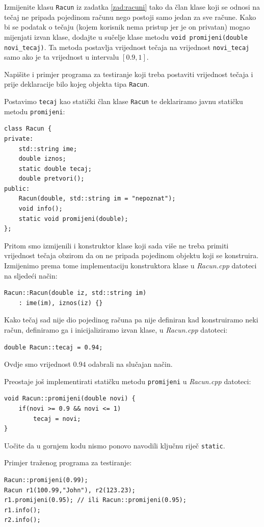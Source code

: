 \begin{zadatak}\label{zad:racuni-static}
    Izmijenite klasu \texttt{Racun} iz zadatka \ref{zad:racuni}
    tako da član klase koji se odnosi na tečaj ne pripada pojedinom
    računu nego postoji samo jedan za sve račune.
    Kako bi se podatak o tečaju (kojem korisnik nema pristup jer 
    je on privatan) mogao mijenjati izvan klase,
    dodajte u sučelje klase metodu
    \texttt{void promijeni(double novi\_tecaj)}.
    Ta metoda postavlja vrijednost tečaja na
    vrijednost \texttt{novi\_tecaj}
    samo ako je ta vrijednost u intervalu 
    $[0.9,1]$.

    Napišite i primjer programa za testiranje koji
    treba postaviti vrijednost tečaja 
    i prije deklaracije bilo kojeg objekta tipa \texttt{Racun}.
\end{zadatak}


\begin{rjesenje}
    Postavimo \texttt{tecaj} kao statički član klase \texttt{Racun}
    te deklariramo javnu statičku metodu \texttt{promijeni}:
\begin{verbatim}
class Racun {
private:
    std::string ime;
    double iznos;
    static double tecaj;
    double pretvori();
public:
    Racun(double, std::string im = "nepoznat");
    void info();
    static void promijeni(double);
};
\end{verbatim}
Pritom smo izmijenili i konstruktor klase koji sada više ne treba primiti vrijednost tečaja obzirom da on ne pripada
    pojedinom objektu koji se konstruira.
Izmijenimo prema tome implementaciju konstruktora klase u \textit{Racun.cpp} datoteci na sljedeći način:
\begin{verbatim}
Racun::Racun(double iz, std::string im)
    : ime(im), iznos(iz) {}
\end{verbatim}
Kako tečaj sad nije dio pojedinog računa pa
nije definiran kad konstruiramo neki račun,
definiramo ga i inicijaliziramo izvan klase,
u \textit{Racun.cpp} datoteci:
\begin{verbatim}
double Racun::tecaj = 0.94;
\end{verbatim}
Ovdje smo vrijednost $0.94$ odabrali na slučajan način.
\medskip

Preostaje još implementirati statičku metodu \texttt{promijeni} u \textit{Racun.cpp} datoteci:
\begin{verbatim}
void Racun::promijeni(double novi) {
    if(novi >= 0.9 && novi <= 1)
        tecaj = novi;
}
\end{verbatim}
Uočite da u gornjem kodu nismo ponovo navodili ključnu riječ \texttt{static}.
\medskip

Primjer traženog programa za testiranje:
\begin{verbatim}
Racun::promijeni(0.99);
Racun r1(100.99,"John"), r2(123.23);
r1.promijeni(0.95); // ili Racun::promijeni(0.95);
r1.info();
r2.info();
\end{verbatim}
\end{rjesenje}

